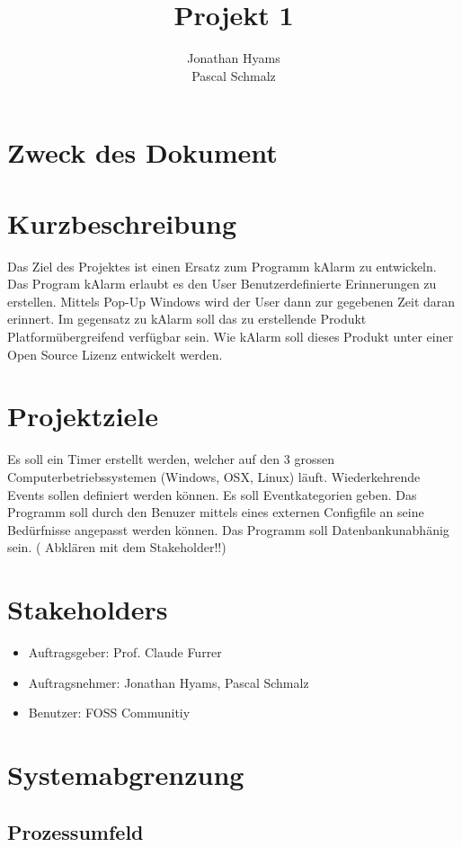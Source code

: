 \documentclass[11pt]{scrreprt}
\title{Projekt 1}
\author{Jonathan Hyams \\Pascal Schmalz}
\begin{document}
\maketitle
\tableofcontents

\begin{abstract}
\end{abstract}
\section{Zweck des Dokument}
\section{Kurzbeschreibung}
Das Ziel des Projektes ist einen Ersatz zum Programm kAlarm zu entwickeln.
Das Program kAlarm erlaubt es den User Benutzerdefinierte Erinnerungen zu erstellen. Mittels Pop-Up Windows wird der User dann zur gegebenen Zeit daran erinnert.
Im gegensatz zu kAlarm soll das zu erstellende Produkt Platformübergreifend verfügbar sein. Wie kAlarm soll dieses Produkt unter einer Open Source Lizenz entwickelt werden.
\section{Projektziele}
Es soll ein Timer erstellt werden, welcher auf den 3 grossen Computerbetriebssystemen (Windows, OSX, Linux)  läuft. 
Wiederkehrende Events sollen definiert werden können.
Es soll Eventkategorien geben.
Das Programm soll durch den Benuzer mittels  eines externen Configfile an seine Bedürfnisse angepasst werden können.
Das Programm soll Datenbankunabhänig sein. ( Abklären mit dem Stakeholder!!)
\section{Stakeholders}
\begin{itemize}
\item{Auftragsgeber: Prof. Claude Furrer}
\item{Auftragsnehmer: Jonathan Hyams, Pascal Schmalz}
\item{Benutzer: FOSS Communitiy}
\end{itemize}
\section {Systemabgrenzung}
\subsection{Prozessumfeld}
\end{document}
